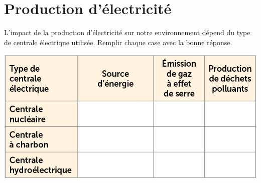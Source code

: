\section{Production d'électricité}\label{ex:prod}

L'impact de la production d'électricité sur notre environnement dépend du type de centrale électrique utilisée.
Remplir chaque case avec la bonne réponse.

\begin{center}
	\includegraphics[scale=0.5]{img/tab_centrales}
\end{center}